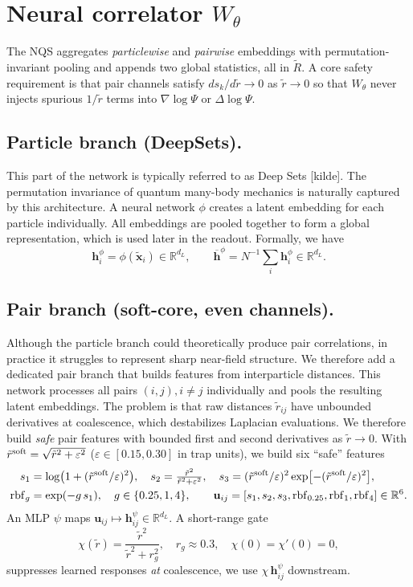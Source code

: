 \section{Neural correlator $W_\theta$}
\label{subsec:nqs}
The NQS aggregates \emph{particlewise} and \emph{pairwise} embeddings with permutation-invariant pooling and appends two global
statistics, all in $\tilde{R}$. A core safety requirement is that pair channels satisfy $d s_k/d\tilde r \to 0$ as $\tilde r\to 0$
so that $W_\theta$ never injects spurious $1/\tilde r$ terms into $\nabla\log\Psi$ or $\Delta\log\Psi$.

\subsection{Particle branch (DeepSets).}
This part of the network is typically referred to as Deep Sets [kilde]. The permutation invariance of quantum many-body mechanics is naturally captured by this architecture. 
A neural network $\phi$ creates a latent embedding for each particle individually. All embeddings are pooled together to form a global representation, which is used later in the readout. Formally, we have
\[
  \mathbf h_i^\phi=\phi(\tilde{\mathbf x}_i)\in\mathbb R^{d_L},\qquad
  \overline{\mathbf h}^{\phi}=N^{-1}\sum_i \mathbf h_i^\phi\in\mathbb R^{d_L}.
\]

\subsection{Pair branch (soft-core, even channels).}
Although the particle branch could theoretically produce pair correlations, in practice it struggles to represent sharp near-field structure. We therefore add a dedicated pair branch that builds features from interparticle distances.
This network processes all pairs $(i,j), i\ne j$ individually and pools the resulting latent embeddings. 
The problem is that raw distances $\tilde r_{ij}$ have unbounded derivatives at coalescence, which destabilizes Laplacian evaluations. We therefore build \emph{safe} pair features with bounded first and second derivatives as $\tilde r\to 0$.
With $\tilde r^{\rm soft}=\sqrt{\tilde r^2+\varepsilon^2}$ ($\varepsilon\!\in[0.15,0.30]$ in trap units), we build six “safe” features
\begin{align}
  s_1 &= \log\!\big(1+(\tilde r^{\rm soft}/\varepsilon)^2\big),\quad
  s_2 = \tfrac{\tilde r^{2}}{\tilde r^{2}+\varepsilon^2},\quad
  s_3 = (\tilde r^{\rm soft}/\varepsilon)^{2}\exp[-(\tilde r^{\rm soft}/\varepsilon)^{2}], \notag\\
  \mathrm{rbf}_g &= \exp(-g\,s_1),\quad g\in\{0.25,1,4\},\qquad
  \mathbf u_{ij}=[s_1,s_2,s_3,\mathrm{rbf}_{0.25},\mathrm{rbf}_{1},\mathrm{rbf}_4]\in\mathbb R^{6}.
  \label{eq:safe-feats}
\end{align}
An MLP $\psi$ maps $\mathbf u_{ij}\mapsto\mathbf h^{\psi}_{ij}\in\mathbb R^{d_L}$. A short-range gate
\[
  \chi(\tilde r)=\frac{\tilde r^{2}}{\tilde r^{2}+r_g^{2}},\quad r_g\approx 0.3,\quad \chi(0)=\chi'(0)=0,
\]
suppresses learned responses \emph{at} coalescence, we use $\chi\,\mathbf h^\psi_{ij}$ downstream.

